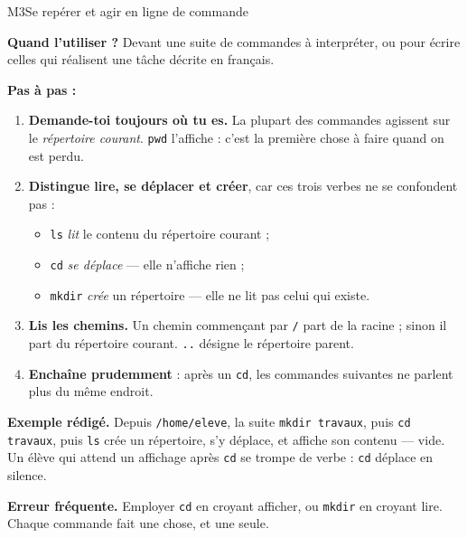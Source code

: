 \begin{fichemethode}{M3}{Se repérer et agir en ligne de commande}

\textbf{Quand l'utiliser ?} Devant une suite de commandes à interpréter, ou pour écrire celles
qui réalisent une tâche décrite en français.

\textbf{Pas à pas :}
\begin{enumerate}
  \item \textbf{Demande-toi toujours où tu es.} La plupart des commandes agissent sur le
        \emph{répertoire courant}. \lstinline{pwd} l'affiche : c'est la première chose à faire
        quand on est perdu.
  \item \textbf{Distingue lire, se déplacer et créer}, car ces trois verbes ne se confondent
        pas :
        \begin{itemize}
          \item \lstinline{ls} \emph{lit} le contenu du répertoire courant ;
          \item \lstinline{cd} \emph{se déplace} — elle n'affiche rien ;
          \item \lstinline{mkdir} \emph{crée} un répertoire — elle ne lit pas celui qui existe.
        \end{itemize}
  \item \textbf{Lis les chemins.} Un chemin commençant par \lstinline{/} part de la racine ;
        sinon il part du répertoire courant. \lstinline{..} désigne le répertoire parent.
  \item \textbf{Enchaîne prudemment} : après un \lstinline{cd}, les commandes suivantes ne
        parlent plus du même endroit.
\end{enumerate}

\textbf{Exemple rédigé.} Depuis \lstinline{/home/eleve}, la suite
\lstinline{mkdir travaux}, puis \lstinline{cd travaux}, puis \lstinline{ls}
crée un répertoire, s'y déplace, et affiche son contenu — vide. Un élève qui attend un
affichage après \lstinline{cd} se trompe de verbe : \lstinline{cd} déplace en silence.

\textbf{Erreur fréquente.} Employer \lstinline{cd} en croyant afficher, ou \lstinline{mkdir}
en croyant lire. Chaque commande fait une chose, et une seule.

\end{fichemethode}
